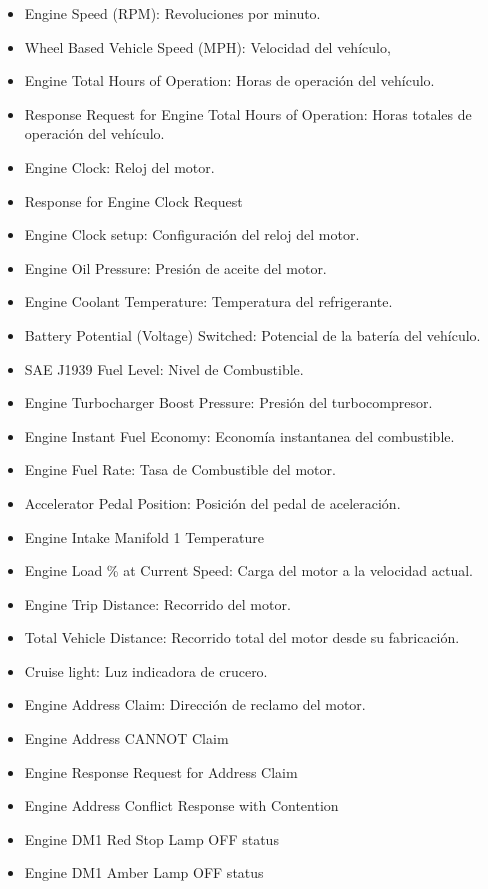 \begin{itemize}
\item Engine Speed (RPM): Revoluciones por minuto.
\item Wheel Based Vehicle Speed (MPH): Velocidad del vehículo, 
\item Engine Total Hours of Operation: Horas de operación del vehículo.
\item Response Request for Engine Total Hours of Operation: Horas totales de operación del vehículo.
\item Engine Clock: Reloj del motor.
\item Response for Engine Clock Request
\item Engine Clock setup: Configuración del reloj del motor.
\item Engine Oil Pressure: Presión de aceite del motor.
\item Engine Coolant Temperature: Temperatura del refrigerante.
\item Battery Potential (Voltage) Switched: Potencial de la batería del vehículo.
\item SAE J1939 Fuel Level: Nivel de Combustible. 
\item Engine Turbocharger Boost Pressure: Presión del turbocompresor.
\item Engine Instant Fuel Economy: Economía instantanea del combustible. 
\item Engine Fuel Rate: Tasa de Combustible del motor.
\item Accelerator Pedal Position: Posición del pedal de aceleración.
\item Engine Intake Manifold 1 Temperature
\item Engine Load \% at Current Speed: Carga del motor a la velocidad actual.
\item Engine Trip Distance: Recorrido del motor.
\item Total Vehicle Distance: Recorrido total del motor desde su fabricación.
\item Cruise light: Luz indicadora de crucero.
\item Engine Address Claim: Dirección de reclamo del motor.
\item Engine Address CANNOT Claim
\item Engine Response Request for Address Claim
\item Engine Address Conflict Response with Contention
\item Engine DM1 Red Stop Lamp OFF status
\item Engine DM1 Amber Lamp OFF status

\end{itemize}
